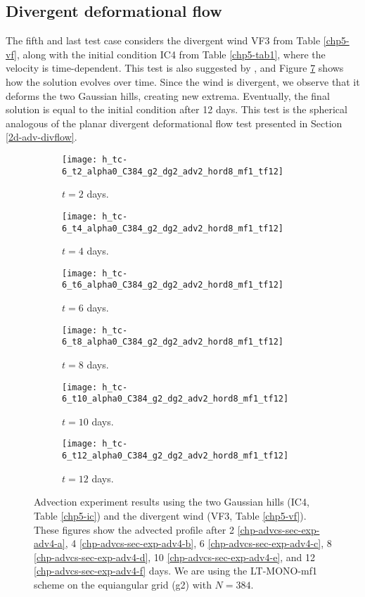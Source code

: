 \subsection{Divergent deformational flow}
The fifth and last test case considers the divergent wind VF3 from Table \ref{chp5-vf}, along with the initial condition IC4 from Table \ref{chp5-tab1}, 
where the velocity is time-dependent.
This test is also suggested by \citet{nair:2010}, and Figure \ref{chp-advcs-sec-exp-adv4} shows how the solution evolves over time.
Since the wind is divergent, we observe that it deforms the two Gaussian hills, creating new extrema.
Eventually, the final solution is equal to the initial condition after 12 days.
This test is the spherical analogous of the planar divergent deformational flow test presented in Section \ref{2d-adv-divflow}.
\begin{figure}[!htb]
	\centering
	\begin{subfigure}{0.45\textwidth}
		\centering
		\texttt{[image: h\_tc-6\_t2\_alpha0\_C384\_g2\_dg2\_adv2\_hord8\_mf1\_tf12]}
		\caption{$t=2$ days.\label{chp-advcs-sec-exp-adv4-a}}
	\end{subfigure}
	\begin{subfigure}{0.45\textwidth}
		\centering
		\texttt{[image: h\_tc-6\_t4\_alpha0\_C384\_g2\_dg2\_adv2\_hord8\_mf1\_tf12]}
		\caption{$t=4$ days.\label{chp-advcs-sec-exp-adv4-b}}
	\end{subfigure}

	\begin{subfigure}{0.45\textwidth}
		\centering
		\texttt{[image: h\_tc-6\_t6\_alpha0\_C384\_g2\_dg2\_adv2\_hord8\_mf1\_tf12]}
		\caption{$t=6$ days.\label{chp-advcs-sec-exp-adv4-c}}
	\end{subfigure}
	\begin{subfigure}{0.45\textwidth}
		\centering
		\texttt{[image: h\_tc-6\_t8\_alpha0\_C384\_g2\_dg2\_adv2\_hord8\_mf1\_tf12]}
		\caption{$t=8$ days.\label{chp-advcs-sec-exp-adv4-d}}
	\end{subfigure}

	\begin{subfigure}{0.45\textwidth}
		\centering
		\texttt{[image: h\_tc-6\_t10\_alpha0\_C384\_g2\_dg2\_adv2\_hord8\_mf1\_tf12]}
		\caption{$t=10$ days.\label{chp-advcs-sec-exp-adv4-e}}
	\end{subfigure}
	\begin{subfigure}{0.45\textwidth}
		\centering
		\texttt{[image: h\_tc-6\_t12\_alpha0\_C384\_g2\_dg2\_adv2\_hord8\_mf1\_tf12]}
		\caption{$t=12$ days.\label{chp-advcs-sec-exp-adv4-f}}
	\end{subfigure}
	\caption{
Advection experiment results using the two Gaussian hills  (IC4, Table \ref{chp5-ic}) and 
the divergent wind (VF3, Table \ref{chp5-vf}).
These figures show the advected profile after
2 \eqref{chp-advcs-sec-exp-adv4-a}, 
4  \eqref{chp-advcs-sec-exp-adv4-b},
6  \eqref{chp-advcs-sec-exp-adv4-c},
8  \eqref{chp-advcs-sec-exp-adv4-d},
10  \eqref{chp-advcs-sec-exp-adv4-e},
and 12  \eqref{chp-advcs-sec-exp-adv4-f} days.
We are using the LT-MONO-mf1 scheme on the equiangular grid (g2) with $N=384$. \label{chp-advcs-sec-exp-adv4}}
\end{figure}

